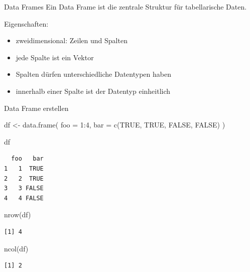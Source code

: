 \documentclass[
  10pt,
  ignorenonframetext,
  aspectratio=169,
]{beamer}
\newenvironment{Shaded}{}{}
\newcommand{\AttributeTok}[1]{\textcolor[rgb]{0.49,0.56,0.16}{#1}}
\newcommand{\ConstantTok}[1]{\textcolor[rgb]{0.53,0.00,0.00}{#1}}
\newcommand{\DecValTok}[1]{\textcolor[rgb]{0.25,0.63,0.44}{#1}}
\newcommand{\FunctionTok}[1]{\textcolor[rgb]{0.02,0.16,0.49}{#1}}
\newcommand{\NormalTok}[1]{#1}
\newcommand{\OtherTok}[1]{\textcolor[rgb]{0.00,0.44,0.13}{#1}}
\newcommand{\SpecialCharTok}[1]{\textcolor[rgb]{0.25,0.44,0.63}{#1}}
\providecommand{\tightlist}{%
  \setlength{\itemsep}{0pt}\setlength{\parskip}{0pt}}
\begin{document}
\begin{frame}{Data Frames}
\label{data-frames-1}
Ein Data Frame ist die zentrale Struktur für tabellarische Daten.

Eigenschaften:

\begin{itemize}
\tightlist
\item
  zweidimensional: Zeilen und Spalten
\item
  jede Spalte ist ein Vektor
\item
  Spalten dürfen unterschiedliche Datentypen haben
\item
  innerhalb einer Spalte ist der Datentyp einheitlich
\end{itemize}
\end{frame}

\begin{frame}[fragile]{Data Frame erstellen}
\label{data-frame-erstellen}
\begin{Shaded}
\begin{Highlighting}[]
\NormalTok{df }\OtherTok{\textless{}{-}} \FunctionTok{data.frame}\NormalTok{(}
  \AttributeTok{foo =} \DecValTok{1}\SpecialCharTok{:}\DecValTok{4}\NormalTok{,}
  \AttributeTok{bar =} \FunctionTok{c}\NormalTok{(}\ConstantTok{TRUE}\NormalTok{, }\ConstantTok{TRUE}\NormalTok{, }\ConstantTok{FALSE}\NormalTok{, }\ConstantTok{FALSE}\NormalTok{)}
\NormalTok{)}

\NormalTok{df}
\end{Highlighting}
\end{Shaded}

\begin{verbatim}
  foo   bar
1   1  TRUE
2   2  TRUE
3   3 FALSE
4   4 FALSE
\end{verbatim}

\begin{Shaded}
\begin{Highlighting}[]
\FunctionTok{nrow}\NormalTok{(df)}
\end{Highlighting}
\end{Shaded}

\begin{verbatim}
[1] 4
\end{verbatim}

\begin{Shaded}
\begin{Highlighting}[]
\FunctionTok{ncol}\NormalTok{(df)}
\end{Highlighting}
\end{Shaded}

\begin{verbatim}
[1] 2
\end{verbatim}
\end{frame}
\end{document}
